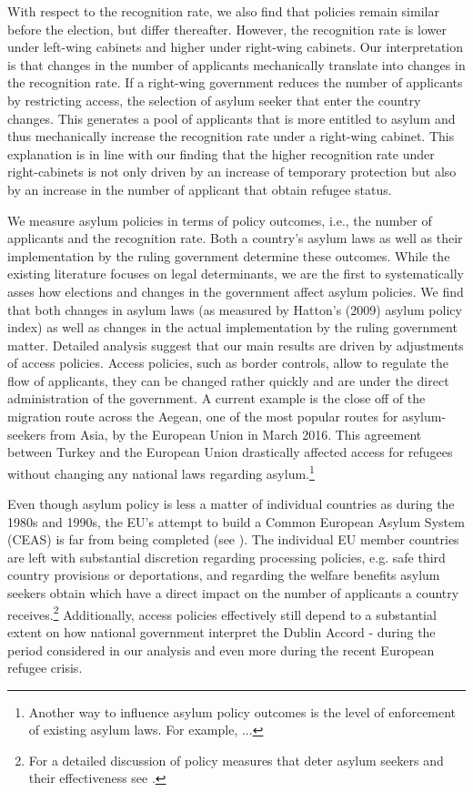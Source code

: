 \documentclass[a4paper,12pt]{article}
\begin{document}
With respect to the recognition rate, we also find that policies remain similar before the election, but differ thereafter. However, the recognition rate is lower under left-wing cabinets and higher under right-wing cabinets. Our interpretation is that changes in the number of applicants mechanically translate into changes in the recognition rate. If a right-wing government reduces the number of applicants by restricting access, the selection of asylum seeker that enter the country changes. This generates a pool of applicants that is more entitled to asylum and thus mechanically increase the recognition rate under a right-wing cabinet. This explanation is in line with our finding that the higher recognition rate under right-cabinets is not only driven by an increase of temporary protection but also by an increase in the number of applicant that obtain refugee status. 

We measure asylum policies in terms of policy outcomes, i.e., the number of applicants and the recognition rate. Both a country's asylum laws as well as their implementation by the ruling government determine these outcomes. While the existing literature focuses on legal determinants, we are the first to systematically asses how elections and changes in the government affect asylum policies. We find that both changes in asylum laws (as measured by Hatton's (2009) asylum policy index) as well as changes in the actual implementation by the ruling government matter. Detailed analysis suggest that our main results are driven by adjustments of access policies. Access policies, such as border controls, allow to regulate the flow of applicants, they can be changed rather quickly and are under the direct administration of the government. A current example is the close off of the migration route across the Aegean, one of the most popular routes for asylum-seekers from Asia, by the European Union in March 2016. This agreement between Turkey and the European Union drastically affected access for refugees without changing any national laws regarding asylum.\footnote{Another way to influence asylum policy outcomes is the level of enforcement of existing asylum laws. For example, ...} 

Even though asylum policy is less a matter of individual countries as during the 1980s and 1990s, the EU's attempt to build a Common European Asylum System (CEAS) is far from being completed (see \citet{hatton2015EU}). The individual EU member countries are left with substantial discretion regarding processing policies, e.g. safe third country provisions or deportations, and regarding the welfare benefits asylum seekers obtain which have a direct impact on the number of applicants a country receives.\footnote{For a detailed discussion of policy measures that deter asylum seekers and their effectiveness see \citet{thielemann2006}.} Additionally, access policies effectively still depend to a substantial extent on how national government interpret the Dublin Accord - during the period considered in our analysis and even more during the recent European refugee crisis.
\end{document}
